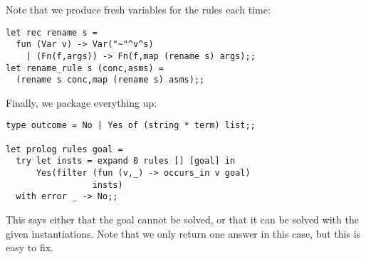 \begin{slide*}


\vspace*{0.5cm}

Note that we produce fresh variables for the rules each time:

\begin{black}\begin{footnotesize}\begin{verbatim}
let rec rename s =
  fun (Var v) -> Var("~"^v^s)
    | (Fn(f,args)) -> Fn(f,map (rename s) args);;
let rename_rule s (conc,asms) =
  (rename s conc,map (rename s) asms);;
\end{verbatim}\end{footnotesize}\end{black}

Finally, we package everything up:

\begin{black}\begin{footnotesize}\begin{verbatim}
type outcome = No | Yes of (string * term) list;;

let prolog rules goal =
  try let insts = expand 0 rules [] [goal] in
      Yes(filter (fun (v,_) -> occurs_in v goal)
                 insts)
  with error _ -> No;;
\end{verbatim}\end{footnotesize}\end{black}

This says either that the goal cannot be solved, or that it can be solved with
the given instantiations. Note that we only return one answer in this case, but
this is easy to fix.

\end{slide*}



